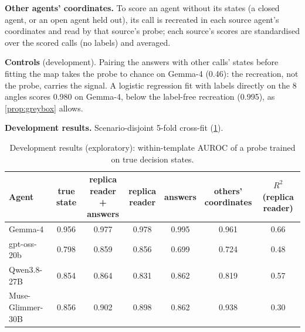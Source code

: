 \textbf{Other agents' coordinates.} To score an agent without its states (a closed agent, or an open agent held out), its call is recreated in each source agent's coordinates and read by that source's probe; each source's scores are standardised over the scored calls (no labels) and averaged.

\textbf{Controls} (development). Pairing the answers with other calls' states before fitting the map takes the probe to chance on Gemma-4 (0.46): the recreation, not the probe, carries the signal. A logistic regression fit with labels directly on the 8 angles scores 0.980 on Gemma-4, below the label-free recreation (0.995), as \cref{prop:greybox} allows.

\textbf{Development results.} Scenario-disjoint 5-fold cross-fit (\cref{tab:greybox-dev}).
\begin{table}[t]
\centering\footnotesize
\caption{Development results (exploratory): within-template AUROC of a probe trained on true decision states.}
\label{tab:greybox-dev}
\begin{tabular}{@{}l cccccc@{}}
\toprule
Agent & true state & \makecell{replica reader\\+ answers} & \makecell{replica\\reader} & answers & \makecell{others'\\coordinates} & \makecell{$R^2$ (replica\\reader)}\\
\midrule
Gemma-4 & 0.956 & 0.977 & 0.978 & 0.995 & 0.961 & 0.66\\
gpt-oss-20b & 0.798 & 0.859 & 0.856 & 0.699 & 0.724 & 0.48\\
Qwen3.8-27B & 0.854 & 0.864 & 0.831 & 0.862 & 0.819 & 0.57\\
Muse-Glimmer-30B & 0.856 & 0.902 & 0.898 & 0.862 & 0.938 & 0.30\\
\bottomrule
\end{tabular}
\end{table}
